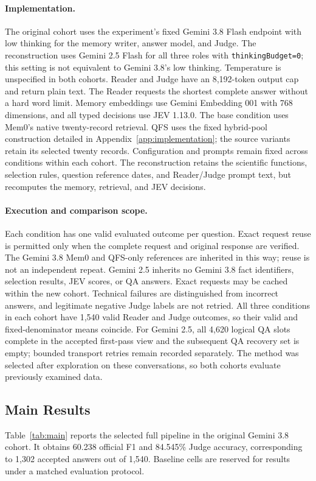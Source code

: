 \documentclass[11pt]{article}
\newcommand{\qfs}{\textsc{QFS}}
\begin{document}
\paragraph{Implementation.}
The original cohort uses the experiment's fixed Gemini 3.8 Flash endpoint with low thinking for the memory writer, answer model, and Judge. The reconstruction uses Gemini 2.5 Flash for all three roles with \texttt{thinkingBudget=0}; this setting is not equivalent to Gemini 3.8's low thinking. Temperature is unspecified in both cohorts. Reader and Judge have an 8,192-token output cap and return plain text. The Reader requests the shortest complete answer without a hard word limit. Memory embeddings use Gemini Embedding 001 with 768 dimensions, and all typed decisions use JEV 1.13.0. The base condition uses Mem0's native twenty-record retrieval. \qfs{} uses the fixed hybrid-pool construction detailed in Appendix~\ref{app:implementation}; the source variants retain its selected twenty records. Configuration and prompts remain fixed across conditions within each cohort. The reconstruction retains the scientific functions, selection rules, question reference dates, and Reader/Judge prompt text, but recomputes the memory, retrieval, and JEV decisions.

\paragraph{Execution and comparison scope.}
Each condition has one valid evaluated outcome per question. Exact request reuse is permitted only when the complete request and original response are verified. The Gemini 3.8 Mem0 and \qfs{}-only references are inherited in this way; reuse is not an independent repeat. Gemini 2.5 inherits no Gemini 3.8 fact identifiers, selection results, JEV scores, or QA answers. Exact requests may be cached within the new cohort. Technical failures are distinguished from incorrect answers, and legitimate negative Judge labels are not retried. All three conditions in each cohort have 1,540 valid Reader and Judge outcomes, so their valid and fixed-denominator means coincide. For Gemini 2.5, all 4,620 logical QA slots complete in the accepted first-pass view and the subsequent QA recovery set is empty; bounded transport retries remain recorded separately. The method was selected after exploration on these conversations, so both cohorts evaluate previously examined data.

\subsection{Main Results}
Table~\ref{tab:main} reports the selected full pipeline in the original Gemini 3.8 cohort. It obtains 60.238 official F1 and 84.545\% Judge accuracy, corresponding to 1,302 accepted answers out of 1,540. Baseline cells are reserved for results under a matched evaluation protocol.
\end{document}
